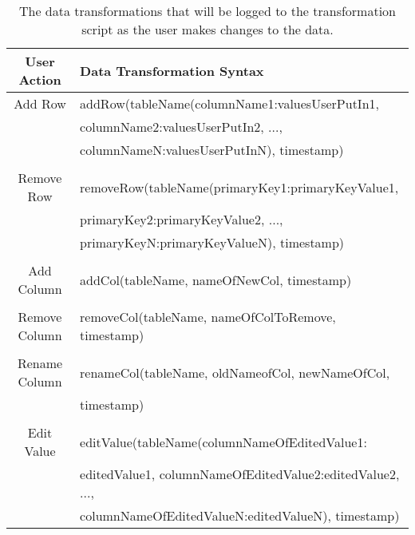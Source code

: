 \documentclass[12pt]{article}
\begin{document}
\begin{table}[h!]
\centering
\begin{tabular}{ | c | l | }
 \hline
    User Action & Data Transformation Syntax \\ \hline \hline
    Add Row & addRow(tableName(columnName1:valuesUserPutIn1,\\ & columnName2:valuesUserPutIn2, ..., \\ & columnNameN:valuesUserPutInN),  timestamp)\\ & \\ \hline
    Remove Row & removeRow(tableName(primaryKey1:primaryKeyValue1,\\ & primaryKey2:primaryKeyValue2, ..., \\ & primaryKeyN:primaryKeyValueN),  timestamp)\\ & \\ \hline
    Add Column & addCol(tableName, nameOfNewCol, timestamp)\\ & \\ \hline
    Remove Column & removeCol(tableName, nameOfColToRemove, timestamp)\\ & \\ \hline
    Rename Column & renameCol(tableName, oldNameofCol, newNameOfCol, \\ & timestamp)\\ & \\ \hline
    Edit Value & editValue(tableName(columnNameOfEditedValue1:\\ & editedValue1, columnNameOfEditedValue2:editedValue2, ..., \\ & columnNameOfEditedValueN:editedValueN),  timestamp)\\ 
    \hline
\end{tabular}
\caption{The data transformations that will be logged to the transformation script as the user makes changes to the data.}
\label{table:transformations_summary}
\end{table}
\end{document}
